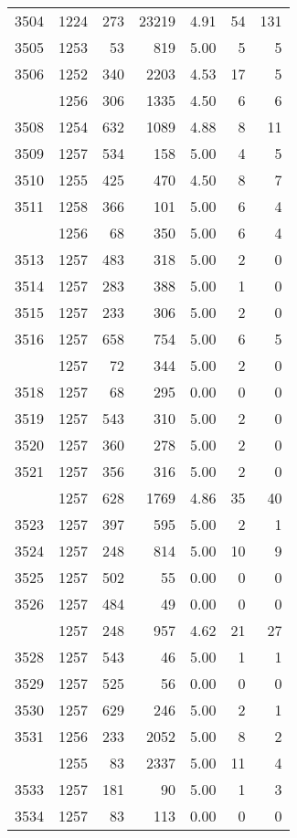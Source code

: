 \documentclass[
]{article}
\begin{document}
\begin{table}
\begin{tabular}[t]{lrrrrrr}
3504 & 1224 & 273 & 23219 & 4.91 & 54 & 131\\
3505 & 1253 & 53 & 819 & 5.00 & 5 & 5\\
3506 & 1252 & 340 & 2203 & 4.53 & 17 & 5\\
\addlinespace
3507 & 1256 & 306 & 1335 & 4.50 & 6 & 6\\
3508 & 1254 & 632 & 1089 & 4.88 & 8 & 11\\
3509 & 1257 & 534 & 158 & 5.00 & 4 & 5\\
3510 & 1255 & 425 & 470 & 4.50 & 8 & 7\\
3511 & 1258 & 366 & 101 & 5.00 & 6 & 4\\
\addlinespace
3512 & 1256 & 68 & 350 & 5.00 & 6 & 4\\
3513 & 1257 & 483 & 318 & 5.00 & 2 & 0\\
3514 & 1257 & 283 & 388 & 5.00 & 1 & 0\\
3515 & 1257 & 233 & 306 & 5.00 & 2 & 0\\
3516 & 1257 & 658 & 754 & 5.00 & 6 & 5\\
\addlinespace
3517 & 1257 & 72 & 344 & 5.00 & 2 & 0\\
3518 & 1257 & 68 & 295 & 0.00 & 0 & 0\\
3519 & 1257 & 543 & 310 & 5.00 & 2 & 0\\
3520 & 1257 & 360 & 278 & 5.00 & 2 & 0\\
3521 & 1257 & 356 & 316 & 5.00 & 2 & 0\\
\addlinespace
3522 & 1257 & 628 & 1769 & 4.86 & 35 & 40\\
3523 & 1257 & 397 & 595 & 5.00 & 2 & 1\\
3524 & 1257 & 248 & 814 & 5.00 & 10 & 9\\
3525 & 1257 & 502 & 55 & 0.00 & 0 & 0\\
3526 & 1257 & 484 & 49 & 0.00 & 0 & 0\\
\addlinespace
3527 & 1257 & 248 & 957 & 4.62 & 21 & 27\\
3528 & 1257 & 543 & 46 & 5.00 & 1 & 1\\
3529 & 1257 & 525 & 56 & 0.00 & 0 & 0\\
3530 & 1257 & 629 & 246 & 5.00 & 2 & 1\\
3531 & 1256 & 233 & 2052 & 5.00 & 8 & 2\\
\addlinespace
3532 & 1255 & 83 & 2337 & 5.00 & 11 & 4\\
3533 & 1257 & 181 & 90 & 5.00 & 1 & 3\\
3534 & 1257 & 83 & 113 & 0.00 & 0 & 0\\

\end{tabular}
\end{table}
\end{document}
